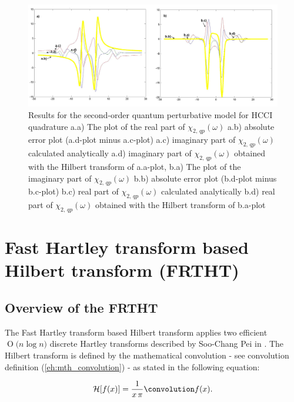 \documentclass[12pt,twoside,a4paper]{article}
\numberwithin{equation}{subsection}
\numberwithin{figure}{subsection}
\newcommand{\BigO}[1]{\ensuremath{\operatorname{O}\bigl(#1\bigr)}}
\begin{document}
\begin{figure} 
  \includegraphics[width=150mm]{img/hcc_qp2.png}
  \caption{Results for the second-order quantum perturbative model for HCCI quadrature
     a.a) The plot of the real part of $\chi_{2, \, qp} (\omega )$
     a.b) absolute error plot (a.d-plot minus a.c-plot) 
     a.c) imaginary part of $\chi_{2, \, qp} (\omega )$ calculated analytically 
     a.d) imaginary part of $\chi_{2, \, qp} (\omega )$ obtained with the Hilbert transform of a.a-plot, 
     b.a) The plot of the imaginary part of ${\chi_{2, \,qp}}(\omega )$ 
     b.b) absolute error plot (b.d-plot minus b.c-plot) 
     b.c) real part of $\chi_{2, \, qp} (\omega )$ calculated analytically 
     b.d) real part of $\chi_{2, \, qp} (\omega )$ obtained with the Hilbert transform of b.a-plot 
     \label{fig:hcc_qp2}
     }
\end{figure}


\section{Fast Hartley transform based Hilbert transform (FRTHT)} \label{chap:hartley}

\subsection{Overview of the FRTHT} \label{chap:hartley_overview}

The Fast Hartley transform based Hilbert transform applies two efficient $\BigO{n \log n}$ discrete Hartley transforms described by Soo-Chang Pei in \cite{chang_computation}. The Hilbert transform is defined by the mathematical convolution - see convolution definition (\ref{eh:mth_convolution}) - as stated in the following equation:

\begin{equation} \label{eq:frtht_convolution}
	\mathcal{H}[f(x)] = \frac{1}{x \, \pi} \convolution f(x) .
\end{equation}
\end{document}
